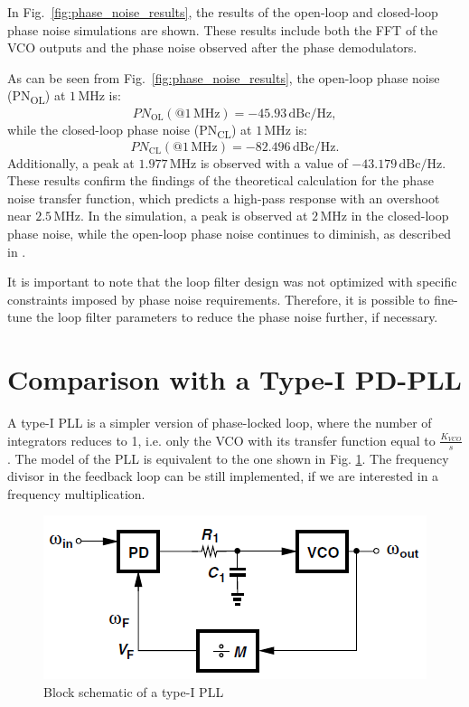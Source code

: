 \documentclass[lettersize,journal]{IEEEtran}
\begin{document}
In Fig.~\ref{fig:phase_noise_results}, the results of the open-loop and closed-loop phase noise simulations are shown. These results include both the FFT of the VCO outputs and the phase noise observed after the phase demodulators.

As can be seen from Fig.~\ref{fig:phase_noise_results}, the open-loop phase noise (PN\textsubscript{OL}) at \(1 \, \text{MHz}\) is: 
\[
PN_{\text{OL}} (@ 1 \, \text{MHz}) =  -45.93 \, \text{dBc/Hz}, 
\]
while the closed-loop phase noise (PN\textsubscript{CL}) at \(1 \, \text{MHz}\) is: 
\[
PN_{\text{CL}} (@ 1 \, \text{MHz}) =  -82.496 \, \text{dBc/Hz}. 
\]
Additionally, a peak at \(1.977 \, \text{MHz}\) is observed with a value of \(-43.179 \, \text{dBc/Hz}\). These results confirm the findings of the theoretical calculation for the phase noise transfer function, which predicts a high-pass response with an overshoot near \(2.5 \, \text{MHz}\). In the simulation, a peak is observed at \(2 \, \text{MHz}\) in the closed-loop phase noise, while the open-loop phase noise continues to diminish, as described in \cite{vco}.

It is important to note that the loop filter design was not optimized with specific constraints imposed by phase noise requirements. Therefore, it is possible to fine-tune the loop filter parameters to reduce the phase noise further, if necessary.

\newpage
\section{Comparison with a Type-I PD-PLL}\label{sec:comparison}
A type-I PLL is a simpler version of phase-locked loop, where the number of integrators reduces to 1, i.e. only the VCO with its transfer function equal to $\frac{K_{VCO}}{s}$. The model of the PLL is equivalent to the one shown in Fig. \ref{fig:type_one_pll_blocks}. The frequency divisor in the feedback loop can be still implemented, if we are interested in a frequency multiplication.

\begin{figure}[!h]
    \centering
    \includegraphics[width=1\linewidth]{images/type_one_pll/block_schematic.png}
    \caption{Block schematic of a type-I PLL}
    \label{fig:type_one_pll_blocks}
\end{figure}
\end{document}
